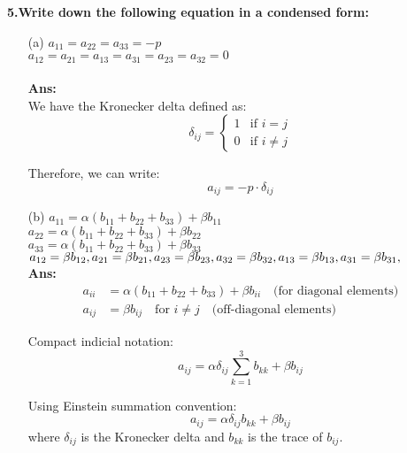 \documentclass[a4paper,12pt]{article}
\begin{document}
\textbf{5.Write down the following equation in a condensed form:}
\begin{enumerate}
    \item[(a)] $ a_{11}=a_{22}=a_{33}=-p$\\
              $ a_{12}=a_{21}=a_{13}=a_{31}=a_{23}=a_{32}=0$\\
              \\
    \textbf{Ans:}\\
   We have the Kronecker delta defined as:\\
    \[
\delta_{ij} = %
\begin{cases} %
1 & \text{if } i = j \\ %
0 & \text{if } i \ne j %
\end{cases} %
\] 




Therefore, we can write:
    \[
    a_{ij} = -p \cdot \delta_{ij}
    \]



    \item[(b)] 
    $ a_{11}=\alpha (b_{11}+ b_{22}+ b_{33}) + \beta b_{11}$\\
    $ a_{22}=\alpha (b_{11}+ b_{22}+ b_{33} )+ \beta b_{22}$\\
    $ a_{33}=\alpha (b_{11}+ b_{22}+ b_{33} )+ \beta b_{33}$\\
    $ a_{12}=\beta b_{12},a_{21}=\beta b_{21},a_{23}=\beta b_{23}\\,a_{32}=\beta b_{32},a_{13}=\beta b_{13},a_{31}=\beta b_{31},$\\

    \textbf{Ans:}
\[
\begin{aligned}
a_{ii} &= \alpha (b_{11} + b_{22} + b_{33}) + \beta b_{ii} \quad \text{(for diagonal elements)} \\
a_{ij} &= \beta b_{ij} \quad \text{for } i \neq j \quad \text{(off-diagonal elements)}
\end{aligned}
\]

    Compact indicial notation:
    \[
    a_{ij} = \alpha \delta_{ij} \sum_{k=1}^3 b_{kk} + \beta b_{ij}
    \]

    Using Einstein summation convention:
    \[
    a_{ij} = \alpha \delta_{ij} b_{kk} + \beta b_{ij}
    \]
    where \( \delta_{ij} \) is the Kronecker delta and \( b_{kk} \) is the trace of \( b_{ij} \).
 \\     
  \\  


\end{enumerate}
\end{document}
